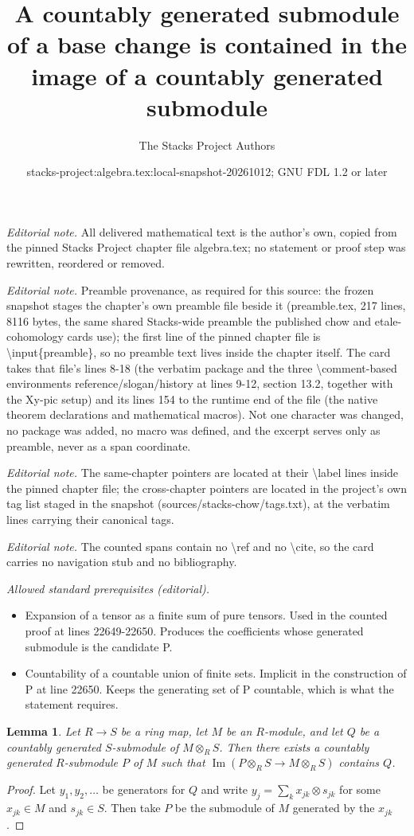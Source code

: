 \documentclass[10pt,a4paper]{amsart}
\title{A countably generated submodule of a base change is contained in the image of a countably generated submodule}
\author{The Stacks Project Authors}
\date{stacks-project:algebra.tex:local-snapshot-20261012; GNU FDL 1.2 or later}
\theoremstyle{plain}
\newtheorem{lemma}[subsection]{Lemma}
\theoremstyle{definition}
\theoremstyle{remark}
\numberwithin{equation}{subsection}
\def\Im{\mathop{\mathrm{Im}}}
\begin{document}
\maketitle
\noindent\textit{Editorial note.} All delivered mathematical text is the author's own, copied from the pinned Stacks Project chapter file algebra.tex; no statement or proof step was rewritten, reordered or removed.\par\medskip
\noindent\textit{Editorial note.} Preamble provenance, as required for this source: the frozen snapshot stages the chapter's own preamble file beside it (preamble.tex, 217 lines, 8116 bytes, the same shared Stacks-wide preamble the published chow and etale-cohomology cards use); the first line of the pinned chapter file is \textbackslash{}input\{preamble\}, so no preamble text lives inside the chapter itself. The card takes that file's lines 8-18 (the verbatim package and the three \textbackslash{}comment-based environments reference/slogan/history at lines 9-12, section 13.2, together with the Xy-pic setup) and its lines 154 to the runtime end of the file (the native theorem declarations and mathematical macros). Not one character was changed, no package was added, no macro was defined, and the excerpt serves only as preamble, never as a span coordinate.\par\medskip
\noindent\textit{Editorial note.} The same-chapter pointers are located at their \textbackslash{}label lines inside the pinned chapter file; the cross-chapter pointers are located in the project's own tag list staged in the snapshot (sources/stacks-chow/tags.txt), at the verbatim lines carrying their canonical tags.\par\medskip
\noindent\textit{Editorial note.} The counted spans contain no \textbackslash{}ref and no \textbackslash{}cite, so the card carries no navigation stub and no bibliography.\par\medskip
\noindent\textit{Allowed standard prerequisites (editorial).}\begin{itemize}
\item Expansion of a tensor as a finite sum of pure tensors. Used in the counted proof at lines 22649-22650. Produces the coefficients whose generated submodule is the candidate P.
\item Countability of a countable union of finite sets. Implicit in the construction of P at line 22650. Keeps the generating set of P countable, which is what the statement requires.
\end{itemize}\medskip
\begin{lemma}
\label{lemma-lift-countably-generated-submodule}
Let $R \to S$ be a ring map, let $M$ be an $R$-module, and let $Q$ be a
countably generated $S$-submodule of $M \otimes_R S$.  Then there exists a
countably generated $R$-submodule $P$ of $M$ such that
$\Im(P \otimes_R S \to M \otimes_R S)$ contains $Q$.
\end{lemma}

\begin{proof}
Let $y_1, y_2, \ldots$ be generators for $Q$ and write $y_j = \sum_k x_{jk}
\otimes s_{jk}$ for some $x_{jk} \in M$ and $s_{jk} \in S$. Then take $P$ be
the submodule of $M$ generated by the $x_{jk}$.
\end{proof}
\end{document}
